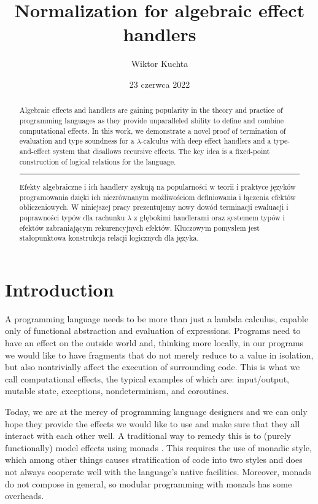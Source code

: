 \documentclass[a4paper, 11pt,titlepage, openright, twoside]{report}
\title{\textbf{Normalization for algebraic effect handlers}}
\author{Wiktor Kuchta}
\date{23 czerwca 2022} %
\newcommand{\+}{\enspace}
\begin{document}
\maketitle


\thispagestyle{empty}
\cleardoublepage
\begin{abstract}
	Algebraic effects and handlers are gaining popularity in the theory and practice
	of programming languages as they provide unparalleled ability to define and combine computational effects.
	In this work,
	we demonstrate a novel proof of termination of evaluation and type soundness for
	a $λ$-calculus with deep effect handlers and a type-and-effect system that
	disallows recursive effects.
	The key idea is a fixed-point construction of logical relations for the language.

	\begin{center} \rule[3pt]{300pt}{1pt} \end{center}

	Efekty algebraiczne i ich handlery zyskują na popularności w teorii i praktyce
	języków programowania dzięki ich niezrównanym możliwościom definiowania i łączenia efektów obliczeniowych.
	W niniejszej pracy
	prezentujemy nowy dowód terminacji ewaluacji i poprawności typów
	dla rachunku $λ$ z głębokimi handlerami oraz systemem typów i efektów zabraniającym
	rekurencyjnych efektów.
	Kluczowym pomysłem jest stałopunktowa konstrukcja relacji logicznych dla języka.
\end{abstract}


\thispagestyle{empty}
\cleardoublepage
\setcounter{page}{5}
\tableofcontents

\chapter{Introduction}
A programming language needs to be more than just a lambda calculus,
capable only of functional abstraction and evaluation of expressions.
Programs need to have an effect on the outside world and, thinking more locally,
in our programs we would like to have fragments that do not merely reduce to a value in isolation,
but also nontrivially affect the execution of surrounding code.
This is what we call computational effects, the typical examples of which are:
input/output, mutable state, exceptions, nondeterminism, and coroutines.


Today, we are at the mercy of programming language designers
and we can only hope they provide the
effects we would like to use and make sure that they all interact with
each other well.
A traditional way to remedy this is to (purely functionally) model effects using monads \cite{monads}.
This requires the use of monadic style, which among other things causes
stratification of code into two styles and does not always cooperate well with
the language's native facilities.
Moreover, monads do not compose in general, so modular programming with monads has some overheads.
\end{document}

